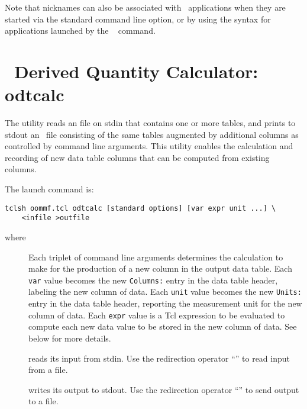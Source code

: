 Note that nicknames can also be associated with \OOMMF\ applications
when they are started via the standard  command line
option, or by using the  syntax for
applications launched by the \MIF\  command.


\section{\ODT\ Derived Quantity Calculator: odtcalc}\label{sec:odtcalc}%

The  utility reads an
 file on stdin
that contains one or more tables, and prints to stdout an \ODT\ file
consisting of the same tables augmented by additional columns as
controlled by command line arguments.  This utility enables the calculation
and recording of new data table columns that can be computed from
existing columns.

The  launch command is:
\begin{verbatim}
tclsh oommf.tcl odtcalc [standard options] [var expr unit ...] \
    <infile >outfile
\end{verbatim}
where
\begin{description}
\item[]
  Each triplet of command line arguments determines the calculation
  to make for the production of a new column in the output data table.
  Each {\tt var} value becomes the new {\tt Columns:} entry in the
  data table header, labeling the new column of data.
  Each {\tt unit} value becomes the new {\tt Units:} entry in the
  data table header, reporting the measurement unit for the new
  column of data.
  Each {\tt expr} value is a Tcl expression to be evaluated to
  compute each new data value to be stored in the new column of data.
  See below for more details.
\item[]
   reads its input from stdin.  Use the redirection operator
  ``\boa'' to read input from a file.
\item[]
   writes its output to stdout.  Use the redirection operator
  ``\bca'' to send output to a file.
\end{description}

